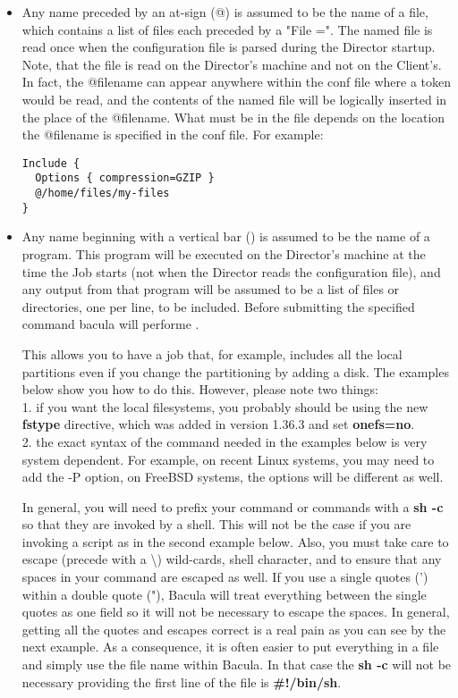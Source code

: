 \begin{itemize}
\item Any name preceded by an at-sign (@) is assumed to be the  name of a
   file, which contains a list of files each preceded by a "File =".  The
   named file is read once when the configuration file is parsed during the
   Director startup.  Note, that the file is read on the Director's machine
   and not on the Client's.  In fact, the @filename can appear anywhere
   within the conf file where a token would be read, and the contents of
   the named file will be logically inserted in the place of the @filename.
   What must be in the file depends on the location the @filename is
   specified in the conf file.  For example:

\footnotesize
\begin{verbatim}
Include {
  Options { compression=GZIP }
  @/home/files/my-files
}
\end{verbatim}
\normalsize

\item Any name beginning with a vertical bar (\vb) is  assumed to be the name of
   a program.  This program will be executed on the Director's machine at
   the time the Job starts (not when the Director reads the configuration
   file), and any output from that program will be assumed to be a list of
   files or directories, one per line, to be included. Before submitting the 
   specified command bacula will performe 
   .

   This allows you to have a job that, for example, includes all the local
   partitions even if you change the partitioning by adding a disk.  The
   examples below show you how to do this.  However, please note two
   things: \\
   1.  if you want the local filesystems, you probably should be
   using the new {\bf fstype} directive, which was added in version 1.36.3 
   and set {\bf onefs=no}.
   \\

   2.  the exact syntax of the command needed in the examples below is very
   system dependent.  For example, on recent Linux systems, you may need to
   add the -P option, on FreeBSD systems, the options will be different as
   well.

   In general, you will need to prefix your command or commands with a {\bf
   sh -c} so that they are invoked by a shell.  This will not be the case
   if you are invoking a script as in the second example below.  Also, you
   must take care to escape (precede with a \textbackslash{}) wild-cards,
   shell character, and to ensure that any spaces in your command are
   escaped as well.  If you use a single quotes (') within a double quote
   ("), Bacula will treat everything between the single quotes as one field
   so it will not be necessary to escape the spaces.  In general, getting
   all the quotes and escapes correct is a real pain as you can see by the
   next example.  As a consequence, it is often easier to put everything in
   a file and simply use the file name within Bacula.  In that case the
   {\bf sh -c} will not be necessary providing the first line of the file
   is {\bf \#!/bin/sh}.


\end{itemize}
